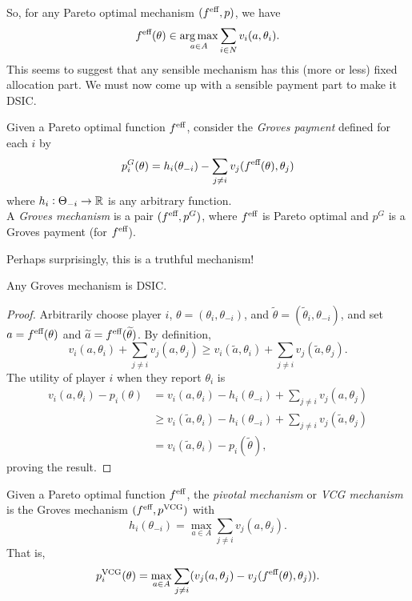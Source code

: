 		So, for any Pareto optimal mechanism $(f^{\text{eff}},p)$, we have
		\[ f^{\text{eff}}(\theta) \in \operatorname*{arg\,max}_{a \in A} \sum_{i \in N} v_i(a,\theta_i). \]
		This seems to suggest that any sensible mechanism has this (more or less) fixed allocation part. We must now come up with a sensible payment part to make it DSIC.
		
		\begin{fdef}
			Given a Pareto optimal function $f^{\text{eff}}$, consider the \emph{Groves payment} defined for each $i$ by
			\[ p_i^G(\theta) = h_i(\theta_{-i}) - \sum_{j \ne i} v_j(f^{\text{eff}}(\theta),\theta_j) \]
			where $h_i : \Theta_{-i} \to \mathbb{R}$ is any arbitrary function.\\
			A \emph{Groves mechanism} is a pair $(f^{\text{eff}},p^G)$, where $f^{\text{eff}}$ is Pareto optimal and $p^G$ is a Groves payment (for $f^{\text{eff}}$).
		\end{fdef}

		Perhaps surprisingly, this is a truthful mechanism!

		\begin{ftheo}
			Any Groves mechanism is DSIC.
		\end{ftheo}
		\begin{proof}
			Arbitrarily choose player $i$, $\theta = (\theta_i,\theta_{-i})$, and $\widetilde{\theta} = (\widetilde{\theta}_i,\theta_{-i})$, and set $a = f^{\text{eff}}(\theta)$ and $\widetilde{a} = f^{\text{eff}}(\widetilde{\theta})$. By definition,
			\[ v_i(a,\theta_i) + \sum_{j \ne i} v_j(a,\theta_j) \ge v_i(\widetilde{a},\theta_i) + \sum_{j \ne i} v_j(\widetilde{a},\theta_j). \]
			The utility of player $i$ when they report $\theta_i$ is
			\begin{align*}
				v_i(a,\theta_i) - p_i(\theta) &= v_i(a,\theta_i) - h_i(\theta_{-i}) + \sum_{j \ne i} v_j(a,\theta_j) \\
				&\ge v_i(\widetilde{a},\theta_i) - h_i(\theta_{-i}) + \sum_{j \ne i} v_j(\widetilde{a},\theta_j) \\
				&= v_i(\widetilde{a},\theta_i) - p_i(\widetilde{\theta}),
			\end{align*}
			proving the result.
		\end{proof}

		\begin{fdef}
			Given a Pareto optimal function $f^{\text{eff}}$, the \emph{pivotal mechanism} or \emph{VCG mechanism} is the Groves mechanism $(f^{\text{eff}},p^{\text{VCG}})$ with
			\[ h_i(\theta_{-i}) = \max_{a \in A} \sum_{j \ne i} v_j(a,\theta_j). \]
			That is,
			\[ p_i^{\text{VCG}}(\theta) = \max_{a \in A} \sum_{j \ne i} (v_j(a,\theta_j) - v_j(f^{\text{eff}}(\theta),\theta_j)). \]
		\end{fdef}

